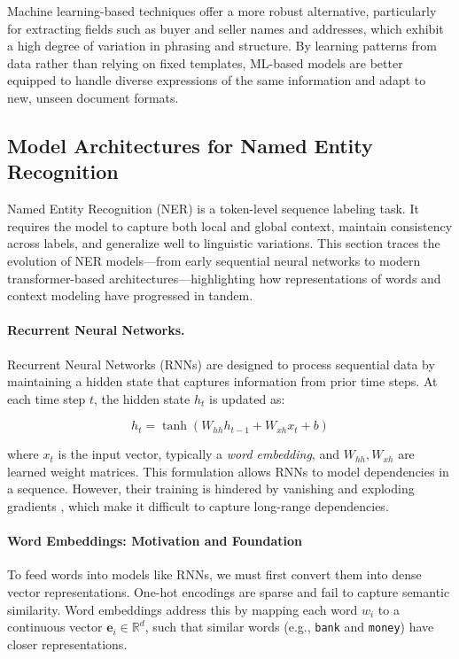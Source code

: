\documentclass{article}
\begin{document}
Machine learning-based techniques offer a more robust alternative, particularly for extracting fields such as buyer and seller names and addresses, which exhibit a high degree of variation in phrasing and structure. By learning patterns from data rather than relying on fixed templates, ML-based models are better equipped to handle diverse expressions of the same information and adapt to new, unseen document formats.


\subsection{Model Architectures for Named Entity Recognition}

Named Entity Recognition (NER) is a token-level sequence labeling task. It requires the model to capture both local and global context, maintain consistency across labels, and generalize well to linguistic variations. This section traces the evolution of NER models—from early sequential neural networks to modern transformer-based architectures—highlighting how representations of words and context modeling have progressed in tandem.

\paragraph{Recurrent Neural Networks.}
Recurrent Neural Networks (RNNs) are designed to process sequential data by maintaining a hidden state that captures information from prior time steps. At each time step $t$, the hidden state $h_t$ is updated as:

\[
h_t = \tanh(W_{hh} h_{t-1} + W_{xh} x_t + b)
\]

where $x_t$ is the input vector, typically a \emph{word embedding}, and $W_{hh}, W_{xh}$ are learned weight matrices. This formulation allows RNNs to model dependencies in a sequence. However, their training is hindered by vanishing and exploding gradients \cite{bengio1994learning}, which make it difficult to capture long-range dependencies.

\paragraph{Word Embeddings: Motivation and Foundation}

To feed words into models like RNNs, we must first convert them into dense vector representations. One-hot encodings are sparse and fail to capture semantic similarity. Word embeddings address this by mapping each word $w_i$ to a continuous vector $\mathbf{e}_i \in \mathbb{R}^d$, such that similar words (e.g., \texttt{bank} and \texttt{money}) have closer representations.
\end{document}
